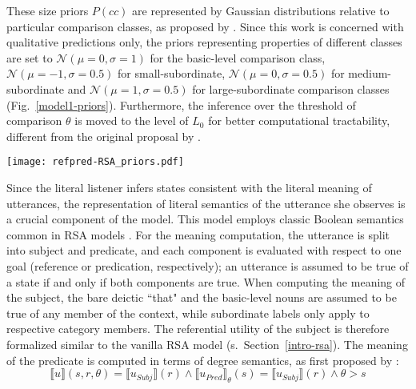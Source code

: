 These size priors $P(cc)$ are represented by Gaussian distributions relative to particular comparison classes, as proposed by \textcite{tessler2017warm}. Since this work is concerned with qualitative predictions only, the priors representing properties of different classes are set to $\mathcal{N}(\mu = 0, \sigma = 1)$ for the basic-level comparison class, $\mathcal{N}(\mu = -1, \sigma = 0.5)$ for small-subordinate, $\mathcal{N}(\mu = 0, \sigma = 0.5)$ for medium-subordinate and $\mathcal{N}(\mu = 1, \sigma = 0.5)$ for large-subordinate comparison classes (Fig.~\ref{model1-priors}). 
Furthermore, the inference over the threshold of comparison $\theta$ is moved to the level of $L_0$ for better computational tractability, different from the original proposal by \textcite{lassiter2013context}.
\begin{figure*}[t]
	\begin{center}
		\texttt{[image: refpred-RSA\_priors.pdf]}
	\end{center}
	\vspace{-0.3cm}
	\caption{Hypothetical prior size distributions over a basic-level (dogs), a small-subordinate(chihuahua), a medium-subordinate (poodle) and a large-subordinate (Great Dane) category. These distributions were used for qualitative tests of the Refpred-RSA model.}
	\label{model1-priors}
\end{figure*}

Since the literal listener infers states consistent with the literal meaning of utterances, the representation of literal semantics of the utterance she observes is a crucial component of the model. This model employs classic Boolean semantics common in RSA models \parencite{montague1973proper, problang}. For the meaning computation, the utterance is split into subject and predicate, and each component is evaluated with respect to one goal (reference or predication, respectively); an utterance is assumed to be true of a state if and only if both components are true.  When computing the meaning of the subject, the bare deictic ``that" and the basic-level nouns are assumed to be true of any member of the context, while subordinate labels only apply to respective category members. The referential utility of the subject is therefore formalized similar to the vanilla RSA model (s.~Section~\ref{intro-rsa}). The meaning of the predicate is computed in terms of degree semantics, as first proposed by \textcite{lassiter2013context}: 
\begin{equation}
\llbracket u \rrbracket (s, r, \theta) = \llbracket u_{Subj} \rrbracket (r) \land \llbracket u_{Pred} \rrbracket_{\theta} (s) = \llbracket u_{Subj} \rrbracket (r) \land \theta > s
\end{equation}
  
